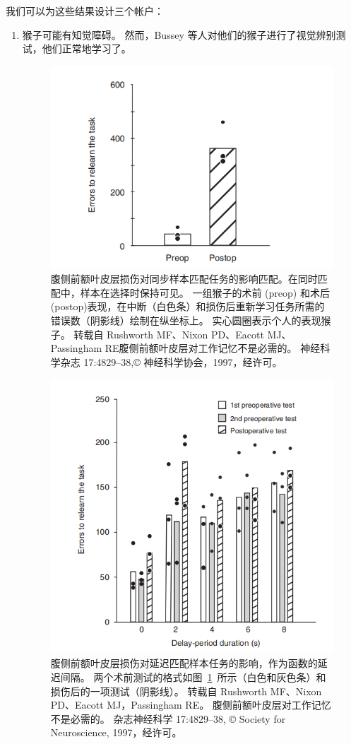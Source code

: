 我们可以为这些结果设计三个帐户：
\begin{enumerate}
\item 猴子可能有知觉障碍。 
然而，Bussey 等人\cite{bussey2001role}对他们的猴子进行了视觉辨别测试，他们正常地学习了。


\begin{figure}
	\centering
	\includegraphics[width=0.6\linewidth]{image_pfc/Fig_7_3}
	\caption{腹侧前额叶皮层损伤对同步样本匹配任务的影响匹配。在同时匹配中，样本在选择时保持可见。
		一组猴子的术前 (preop) 和术后 (postop)表现，在中断（白色条）和损伤后重新学习任务所需的错误数（阴影线）绘制在纵坐标上。 
		实心圆圈表示个人的表现猴子。 
	转载自 Rushworth MF、Nixon PD、Eacott MJ、Passingham RE腹侧前额叶皮层对工作记忆不是必需的。 神经科学杂志 17:4829–38,© 神经科学协会，1997，经许可。\label{fig:7_3}}
\end{figure}


\begin{figure}
	\centering
	\includegraphics[width=0.6\linewidth]{image_pfc/Fig_7_4}
	\caption{腹侧前额叶皮层损伤对延迟匹配样本任务的影响，作为函数的延迟间隔。 
		两个术前测试的格式如图~\ref{fig:7_3}~所示（白色和灰色条）和损伤后的一项测试（阴影线）。 
		转载自 Rushworth MF、Nixon PD、Eacott MJ，Passingham RE。 
		腹侧前额叶皮层对工作记忆不是必需的。
		杂志神经科学 17:4829–38, © Society for Neuroscience, 1997，经许可。\label{fig:7_4}}
\end{figure}



\end{enumerate}
